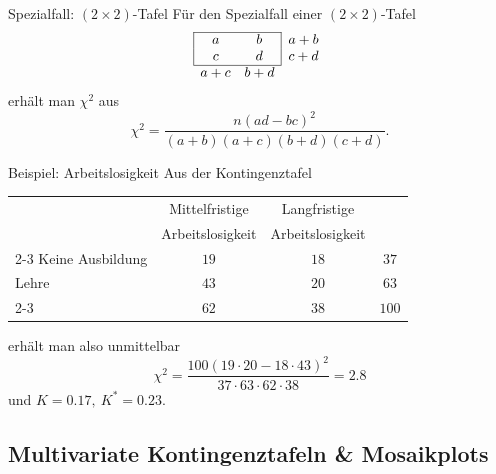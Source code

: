 \documentclass[
  10pt,
  ignorenonframetext,
]{beamer}
\begin{document}
\begin{frame}{Spezialfall: \((2 \times 2)\)-Tafel}
\protect\hypertarget{spezialfall-2-times-2-tafel}{}
Für den Spezialfall einer \((2 \times 2)\)-Tafel \begin{displaymath}
\begin{array}{|cc|c}\cline{1-2}
a & b & a+b\\
c & d & c+d\\ \cline{1-2}
\multicolumn{1}{c}{a+c}
  & \multicolumn{1}{c}{b+d}
\end{array}
\end{displaymath} erhält man \(\chi^2\) aus \begin{displaymath}
\chi^2 = \frac{n(ad-bc)^2}{(a+b)(a+c)(b+d)(c+d)}.
\end{displaymath}
\end{frame}

\begin{frame}{Beispiel: Arbeitslosigkeit}
\protect\hypertarget{beispiel-arbeitslosigkeit-2}{}
Aus der Kontingenztafel

\begin{center}\small
\begin{tabular}{l|cc|c}
\multicolumn{1}{c}{}
& \multicolumn{1}{c}{Mittelfristige}
  & \multicolumn{1}{c}{Langfristige}\\
\multicolumn{1}{c}{}
& \multicolumn{1}{c}{Arbeitslosigkeit}
  & \multicolumn{1}{c}{Arbeitslosigkeit}\\\cline{2-3}
Keine Ausbildung  & $19$ & $18$ & $37$ \\
Lehre             & $43$ & $20$ & $63$ \\\cline{2-3}
\multicolumn{1}{c}{}
& \multicolumn{1}{c}{$62$}
  & \multicolumn{1}{c}{$38$} & $100$
\end{tabular}
\end{center}

erhält man also unmittelbar \begin{displaymath}
\chi^2 = \frac{100(19\cdot 20-18\cdot 43)^2}{37\cdot 63\cdot 62 \cdot38} = 2.8
\end{displaymath} und \(K = 0.17,\ K^* = 0.23\).
\end{frame}

\hypertarget{multivariate-kontingenztafeln-mosaikplots}{%
\subsection{Multivariate Kontingenztafeln \&
Mosaikplots}\label{multivariate-kontingenztafeln-mosaikplots}}
\end{document}
